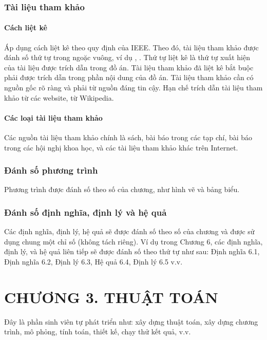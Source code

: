 \documentclass{article} %
\begin{document}
\subsubsection{Tài liệu tham khảo}
\paragraph{Cách liệt kê}\mbox{}

Áp dụng cách liệt kê theo quy định của IEEE. Theo đó, tài liệu tham khảo được đánh số thứ tự trong ngoặc vuông, ví dụ \cite{jakobsson2020physical}, \cite{byrne2014effect}. Thứ tự liệt kê là thứ tự xuất hiện của tài liệu được trích dẫn trong đồ án. Tài liệu tham khảo đã liệt kê bắt buộc phải được trích dẫn trong phần nội dung của đồ án. Tài liệu tham khảo cần có nguồn gốc rõ ràng và phải từ nguồn đáng tin cậy. Hạn chế trích dẫn tài liệu tham khảo từ các website, từ Wikipedia.\vspace{-12pt}
\paragraph{Các loại tài liệu tham khảo}\mbox{}

Các nguồn tài liệu tham khảo chính là sách, bài báo trong các tạp chí, bài báo trong các hội nghị khoa học, và các tài liệu tham khảo khác trên Internet.

\subsubsection{Đánh số phương trình}
Phương trình được đánh số theo số của chương, như hình vẽ và bảng biểu.
\subsubsection{Đánh số định nghĩa, định lý và hệ quả}
Các định nghĩa, định lý, hệ quả sẽ được đánh số theo số của chương và được sử dụng chung một chỉ số (không tách riêng). Ví dụ trong Chương 6, các định nghĩa, định lý, và hệ quả liên tiếp sẽ được đánh số theo thứ tự như sau: Định nghĩa 6.1, Định nghĩa 6.2, Định lý 6.3, Hệ quả 6.4, Định lý 6.5 v.v.
\newpage
\section*{\centering CHƯƠNG 3. THUẬT TOÁN}
\setcounter{section}{3}
\setcounter{subsection}{0}
\setcounter{figure}{0}
\setcounter{table}{0}
 {}
Đây là phần sinh viên tự phát triển như: xây dựng thuật toán, xây dựng chương trình, mô phỏng, tính toán, thiết kế, chạy thử kết quả, v.v\cite{bworld}. 
\end{document}

